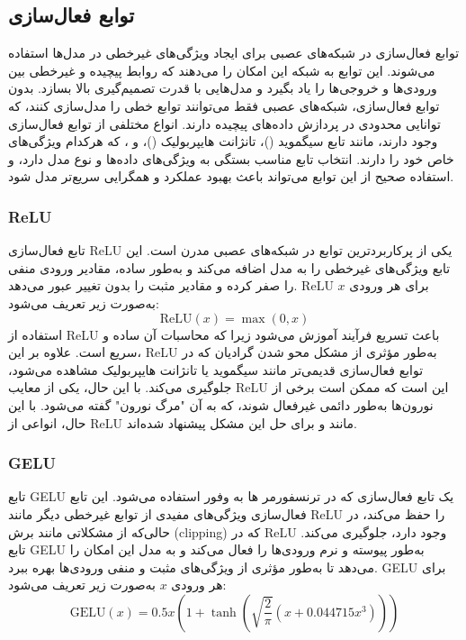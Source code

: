 \subsection{توابع فعال‌سازی\protect{}}
توابع فعال‌سازی در شبکه‌های عصبی برای ایجاد ویژگی‌های غیرخطی در مدل‌ها استفاده می‌شوند. این توابع به شبکه این امکان را می‌دهند که روابط پیچیده و غیرخطی بین ورودی‌ها و خروجی‌ها را یاد بگیرد و مدل‌هایی با قدرت تصمیم‌گیری بالا بسازد. بدون توابع فعال‌سازی، شبکه‌های عصبی فقط می‌توانند توابع خطی را مدل‌سازی کنند، که توانایی محدودی در پردازش داده‌های پیچیده دارند. انواع مختلفی از توابع فعال‌سازی وجود دارند، مانند تابع سیگموید ()، تانژانت هایپربولیک ()،  و ، که هرکدام ویژگی‌های خاص خود را دارند. انتخاب تابع مناسب بستگی به ویژگی‌های داده‌ها و نوع مدل دارد، و استفاده صحیح از این توابع می‌تواند باعث بهبود عملکرد و همگرایی سریع‌تر مدل شود.

\subsubsection{ReLU\protect{}}
تابع فعال‌سازی ReLU یکی از پرکاربردترین توابع در شبکه‌های عصبی مدرن است. این تابع ویژگی‌های غیرخطی را به مدل اضافه می‌کند و به‌طور ساده، مقادیر ورودی منفی را صفر کرده و مقادیر مثبت را بدون تغییر عبور می‌دهد. ReLU برای هر ورودی $x$ به‌صورت زیر تعریف می‌شود:
$$
\text{ReLU}(x) = \max(0, x)
$$
استفاده از ReLU باعث تسریع فرآیند آموزش می‌شود زیرا که محاسبات آن ساده و سریع است. علاوه بر این، ReLU به‌طور مؤثری از مشکل محو شدن گرادیان که در توابع فعال‌سازی قدیمی‌تر مانند سیگموید یا تانژانت هایپربولیک مشاهده می‌شود، جلوگیری می‌کند. با این حال، یکی از معایب ReLU این است که ممکن است برخی از نورون‌ها به‌طور دائمی غیرفعال شوند، که به آن "مرگ نورون" گفته می‌شود. با این حال، انواعی از ReLU مانند  و  برای حل این مشکل پیشنهاد شده‌اند.


\subsubsection{GELU\protect{}}
تابع GELU یک تابع فعال‌سازی که در ترنسفورمر ها به وفور استفاده می‌شود.  این تابع فعال‌سازی ویژگی‌های مفیدی از توابع غیرخطی دیگر مانند ReLU را حفظ می‌کند، در حالی‌که از مشکلاتی مانند برش (clipping) که در ReLU وجود دارد، جلوگیری می‌کند. تابع GELU به‌طور پیوسته و نرم ورودی‌ها را فعال می‌کند و به مدل این امکان را می‌دهد تا به‌طور مؤثری از ویژگی‌های مثبت و منفی ورودی‌ها بهره ببرد. GELU برای هر ورودی $x$ به‌صورت زیر تعریف می‌شود:
$$
\text{GELU}(x) = 0.5x \left( 1 + \tanh\left( \sqrt{\frac{2}{\pi}}(x + 0.044715x^3) \right) \right)
$$

